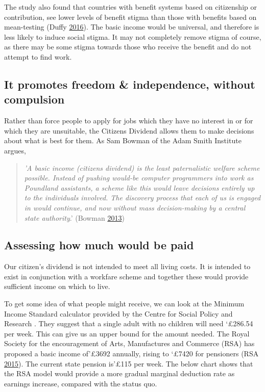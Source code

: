 \documentclass[]{tufte-handout}
\begin{document}
The study also found that countries with benefit systems based on
citizenship or contribution, see lower levels of benefit stigma than
those with benefits based on mean-testing (Duffy
\protect\hyperlink{ref-Duffy}{2016}). The basic income would be
universal, and therefore is less likely to induce social stigma. It may
not completely remove stigma of course, as there may be some stigma
towards those who receive the benefit and do not attempt to find work.

\hypertarget{it-promotes-freedom-independence-without-compulsion}{%
\subsection{It promotes freedom \& independence, without
compulsion}\label{it-promotes-freedom-independence-without-compulsion}}

Rather than force people to apply for jobs which they have no interest
in or for which they are unsuitable, the Citizens Dividend allows them
to make decisions about what is best for them. As Sam Bowman of the Adam
Smith Institute argues,

\begin{quote}
\emph{'A basic income (citizens dividend) is the least paternalistic
welfare scheme possible. Instead of pushing would-be computer
programmers into work as Poundland assistants, a scheme like this would
leave decisions entirely up to the individuals involved. The discovery
process that each of us is engaged in would continue, and now without
mass decision-making by a central state authority}.' (Bowman
\protect\hyperlink{ref-SamBowman2013}{2013})
\end{quote}

\hypertarget{assessing-how-much-would-be-paid}{%
\subsection{Assessing how much would be
paid}\label{assessing-how-much-would-be-paid}}

Our citizen's dividend is not intended to meet all living costs. It is
intended to exist in conjunction with a workfare scheme and together
these would provide sufficient income on which to live.

To get some idea of what people might receive, we can look at the
Minimum Income Standard calculator provided by the Centre for Social
Policy and Research . They suggest that a single adult with no children
will need `£286.54 per week. This can give us an upper bound for the
amount needed. The Royal Society for the encouragement of Arts,
Manufactures and Commerce (RSA) has proposed a basic income of'£3692
annually, rising to `£7420 for pensioners (RSA
\protect\hyperlink{ref-RSA2015}{2015}). The current state pension
is'£115 per week. The below chart shows that the RSA model would provide
a more gradual marginal deduction rate as earnings increase, compared
with the status quo.
\end{document}

